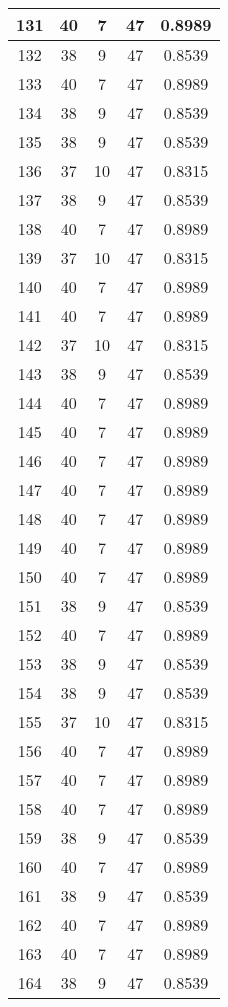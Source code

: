 \documentclass[letterpaper, 12pt]{article}
\begin{document}
\begin{longtable}{|c|c|c|c|c|}
\hline
131 & 40 & 7 & 47 & 0.8989 \\
\hline
132 & 38 & 9 & 47 & 0.8539 \\
\hline
133 & 40 & 7 & 47 & 0.8989 \\
\hline
134 & 38 & 9 & 47 & 0.8539 \\
\hline
135 & 38 & 9 & 47 & 0.8539 \\
\hline
136 & 37 & 10 & 47 & 0.8315 \\
\hline
137 & 38 & 9 & 47 & 0.8539 \\
\hline
138 & 40 & 7 & 47 & 0.8989 \\
\hline
139 & 37 & 10 & 47 & 0.8315 \\
\hline
140 & 40 & 7 & 47 & 0.8989 \\
\hline
141 & 40 & 7 & 47 & 0.8989 \\
\hline
142 & 37 & 10 & 47 & 0.8315 \\
\hline
143 & 38 & 9 & 47 & 0.8539 \\
\hline
144 & 40 & 7 & 47 & 0.8989 \\
\hline
145 & 40 & 7 & 47 & 0.8989 \\
\hline
146 & 40 & 7 & 47 & 0.8989 \\
\hline
147 & 40 & 7 & 47 & 0.8989 \\
\hline
148 & 40 & 7 & 47 & 0.8989 \\
\hline
149 & 40 & 7 & 47 & 0.8989 \\
\hline
150 & 40 & 7 & 47 & 0.8989 \\
\hline
151 & 38 & 9 & 47 & 0.8539 \\
\hline
152 & 40 & 7 & 47 & 0.8989 \\
\hline
153 & 38 & 9 & 47 & 0.8539 \\
\hline
154 & 38 & 9 & 47 & 0.8539 \\
\hline
155 & 37 & 10 & 47 & 0.8315 \\
\hline
156 & 40 & 7 & 47 & 0.8989 \\
\hline
157 & 40 & 7 & 47 & 0.8989 \\
\hline
158 & 40 & 7 & 47 & 0.8989 \\
\hline
159 & 38 & 9 & 47 & 0.8539 \\
\hline
160 & 40 & 7 & 47 & 0.8989 \\
\hline
161 & 38 & 9 & 47 & 0.8539 \\
\hline
162 & 40 & 7 & 47 & 0.8989 \\
\hline
163 & 40 & 7 & 47 & 0.8989 \\
\hline
164 & 38 & 9 & 47 & 0.8539 \\

\end{longtable}
\end{document}
